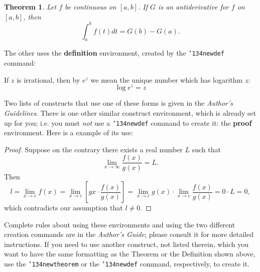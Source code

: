 \documentclass{sig-alternate-05-2015}
\begin{document}
\newtheorem{theorem}{Theorem}
\begin{theorem}
	Let $f$ be continuous on $[a,b]$.  If $G$ is an antiderivative for $f$ on $[a,b]$, then 
	\begin{displaymath}
		\int^b_af(t)dt = G(b) - G(a).
	\end{displaymath}
\end{theorem}

The other uses the \textbf{definition} environment, created by the \texttt{{\char'134}newdef} command:  

\begin{definition}
	If $z$ is irrational, then by $e^z$ we mean the unique number which has logarithm $z$: 
	\begin{displaymath}{\log e^z = z}\end{displaymath}
\end{definition}

Two lists of constructs that use one of these forms is given in the \textit{Author's  Guidelines}. There is one other similar construct environment, which is already set up for you; i.e. you must \textit{not} use a \texttt{{\char'134}newdef} command to create it: the \textbf{proof} environment.  Here is a example of its use: 

\begin{proof}
	Suppose on the contrary there exists a real number $L$ such that
	\begin{displaymath}
		\lim_{x\rightarrow\infty} \frac{f(x)}{g(x)} = L.
	\end{displaymath}
	Then
	\begin{displaymath}
		l=\lim_{x\rightarrow c} f(x)
		= \lim_{x\rightarrow c}
		\left[ g{x} \cdot \frac{f(x)}{g(x)} \right ]
		= \lim_{x\rightarrow c} g(x) \cdot \lim_{x\rightarrow c}
		\frac{f(x)}{g(x)} = 0\cdot L = 0,
	\end{displaymath}
	which contradicts our assumption that $l\neq 0$.
\end{proof}

Complete rules about using these environments and using the two different creation commands are in the \textit{Author's Guide}; please consult it for more detailed instructions.  If you need to use another construct, not listed therein, which you want to have the same formatting as the Theorem or the Definition\cite{salas:calculus} shown above, use the \texttt{{\char'134}newtheorem} or the \texttt{{\char'134}newdef} command, respectively, to create it.
\end{document}
